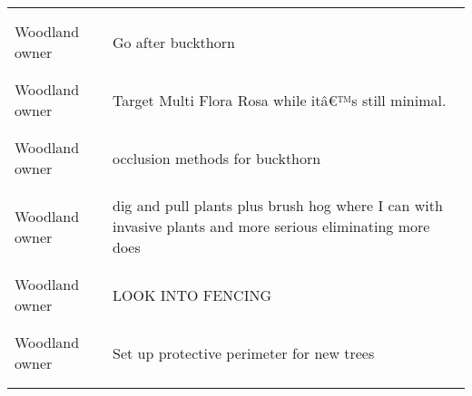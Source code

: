 \documentclass[
]{article}
\begin{document}
\begin{longtable}[t]{l>{\raggedright\arraybackslash}p{10cm}}
\midrule\\
\cellcolor{gray!10}{Woodland owner} & \cellcolor{gray!10}{Will continue to discuss with my forester ways to manage for invasives and deer.}\\
\midrule
Woodland owner & Go after buckthorn\\
\midrule\\
\cellcolor{gray!10}{Woodland owner} & \cellcolor{gray!10}{Significant invasive and interfering vegetation control efforts this year, but those were already planned.}\\
\midrule
Woodland owner & Target Multi Flora Rosa while itâ€™s still minimal.\\
\midrule\\
\addlinespace
\cellcolor{gray!10}{Woodland owner} & \cellcolor{gray!10}{install several fenced test plots to guage deer impacts}\\
\midrule
Woodland owner & occlusion methods for buckthorn\\
\midrule\\
\cellcolor{gray!10}{Woodland owner} & \cellcolor{gray!10}{Continue planting and protecting individual trees}\\
\midrule
Woodland owner & dig and pull plants plus brush hog where I can with invasive plants and more serious eliminating more does\\
\midrule\\
\cellcolor{gray!10}{Woodland owner} & \cellcolor{gray!10}{Some tree planting in forest clearings}\\
\midrule
\addlinespace
Woodland owner & LOOK INTO FENCING\\
\midrule\\
\cellcolor{gray!10}{Woodland owner} & \cellcolor{gray!10}{I want to go through my wood throughly this year and identify any potential invasives and formulate a good plan for their removal}\\
\midrule
Woodland owner & Set up protective perimeter for new trees\\
\midrule\\
\cellcolor{gray!10}{Woodland owner} & \cellcolor{gray!10}{I have already contacted my local NRCS to update my forestry management plan and apply for technical assistance related to habitat/ stewardship goals on my property.}\\
\midrule
\bottomrule
\end{longtable}
\end{document}
